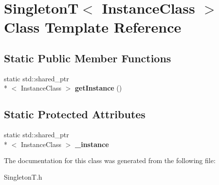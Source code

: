 \hypertarget{class_singleton_t}{\section{Singleton\-T$<$ Instance\-Class $>$ Class Template Reference}
\label{d4/dde/class_singleton_t}
}
\subsection*{Static Public Member Functions}
\begin{DoxyCompactItemize}
\item 
\hypertarget{class_singleton_t_af7e4515121587486349e941e7cbb3169}{static std\-::shared\-\_\-ptr\\*
$<$ Instance\-Class $>$ {\bfseries get\-Instance} ()}\label{d4/dde/class_singleton_t_af7e4515121587486349e941e7cbb3169}

\end{DoxyCompactItemize}
\subsection*{Static Protected Attributes}
\begin{DoxyCompactItemize}
\item 
\hypertarget{class_singleton_t_a9327efc07481550d56184be89a54611b}{static std\-::shared\-\_\-ptr\\*
$<$ Instance\-Class $>$ {\bfseries \-\_\-instance}}\label{d4/dde/class_singleton_t_a9327efc07481550d56184be89a54611b}

\end{DoxyCompactItemize}


The documentation for this class was generated from the following file\-:\begin{DoxyCompactItemize}
\item 
Singleton\-T.\-h\end{DoxyCompactItemize}
